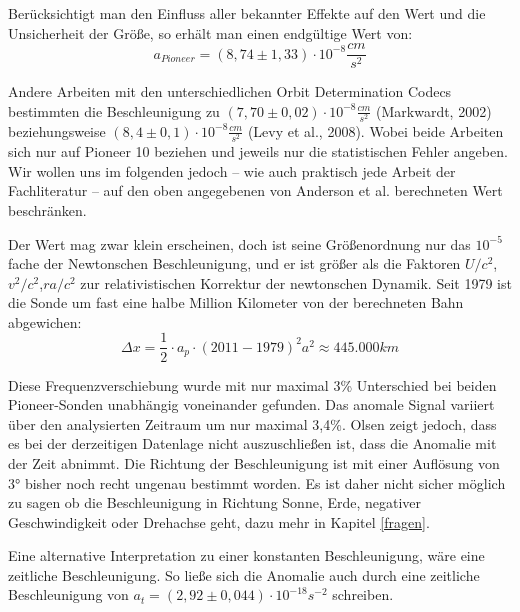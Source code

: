 Berücksichtigt man den Einfluss aller bekannter Effekte auf den Wert und die Unsicherheit der Größe\cite{Turyshev2004}, so erhält man einen endgültige Wert von:  
\begin{equation}
  a_{Pioneer} = (8,74\pm1,33)\cdot10^{-8}\frac{cm}{s^2}
\end{equation}

Andere Arbeiten mit den  unterschiedlichen Orbit Determination Codecs bestimmten die Beschleunigung zu $(7,70
\pm0,02)\cdot10^{-8}\frac{cm}{s^2}$ (Markwardt, 2002)\cite{Markwardt2002} beziehungsweise %
$(8,4\pm0,1)\cdot10^{-8}\frac{cm}{s^2}$ (Levy et al., 2008)\cite{Levy2008}.
Wobei beide Arbeiten sich nur auf Pioneer 10 beziehen und jeweils nur die statistischen Fehler angeben.
Wir wollen uns im folgenden jedoch – wie auch praktisch jede Arbeit der Fachliteratur – auf den oben angegebenen von
Anderson et al. berechneten Wert beschränken.

Der Wert mag zwar klein erscheinen, doch ist seine Größenordnung nur das $10^{-5}$ fache der Newtonschen Beschleunigung,
und er ist größer als die Faktoren $U/c^2$,$v^2/c^2$,$r a/c^2$ zur relativistischen Korrektur der newtonschen Dynamik.
Seit 1979 ist die Sonde um fast eine halbe Million Kilometer von der berechneten Bahn abgewichen:
\begin{equation}
  \Delta x= \frac12 \cdot a_p \cdot (2011-1979)^2 a^2\approx 445.000 km
\end{equation}

Diese Frequenzverschiebung wurde mit nur maximal 3\% Unterschied bei beiden Pioneer-Sonden unabhängig voneinander
gefunden. Das anomale Signal variiert über den analysierten Zeitraum um nur maximal 3,4\%\cite{Turyshev2004}.
Olsen zeigt jedoch, dass es bei der derzeitigen Datenlage nicht auszuschließen ist, dass die Anomalie mit der Zeit abnimmt.\cite{Olsen2006}
Die Richtung der
Beschleunigung ist mit einer Auflösung von 3° bisher noch recht ungenau bestimmt worden. Es ist daher nicht sicher möglich
zu sagen ob die Beschleunigung
in Richtung Sonne, Erde, negativer Geschwindigkeit oder Drehachse geht, dazu mehr in Kapitel \ref{fragen}.

Eine alternative Interpretation zu einer konstanten Beschleunigung, wäre eine zeitliche Beschleunigung.
So ließe sich die Anomalie auch durch eine zeitliche Beschleunigung von $a_t = (2,92 \pm 0,044) \cdot 10^{-18} s^{-2}$ schreiben.

